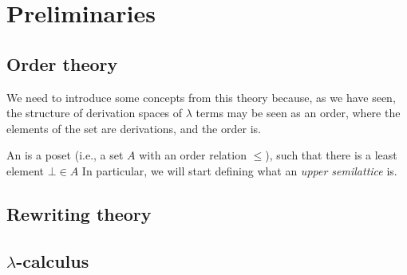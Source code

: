 
\chapter{Preliminaries}

\section{Order theory}

We need to introduce some concepts from this theory because, as we have seen,
the structure of derivation spaces of $\lambda$ terms may be seen as an order,
where the elements of the set are derivations, and the order is.

An  is a poset (i.e., a set $A$  with an order relation $\leq$), such that
there is a least element $\bot \in A$
In particular, we will  start defining what an \textit{upper semilattice} is.

\section{Rewriting theory}

\section{$\lambda$-calculus}
